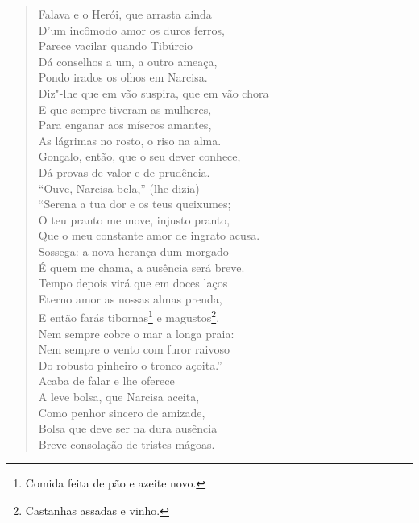 \begin{verse}
Falava e o Herói, que arrasta ainda\\
D'um incômodo amor os duros ferros,\\
Parece vacilar quando Tibúrcio\\
Dá conselhos a um, a outro ameaça,\\
Pondo irados os olhos em Narcisa.\\
Diz"-lhe que em vão suspira, que em vão chora\\
E que sempre tiveram as mulheres,\\
Para enganar aos míseros amantes,\\
As lágrimas no rosto, o riso na alma.\\
Gonçalo, então, que o seu dever conhece,\\
Dá provas de valor e de prudência.\\
``Ouve, Narcisa bela,'' (lhe dizia)\\
``Serena a tua dor e os teus queixumes;\\
O teu pranto me move, injusto pranto,\\
Que o meu constante amor de ingrato acusa.\\
Sossega: a nova herança dum morgado\\ 		\index{\Morg}
É quem me chama, a ausência será breve.\\
Tempo depois virá que em doces laços\\
Eterno amor as nossas almas prenda,\\
E então farás tibornas\footnote{ Comida feita de pão e azeite novo.}
e magustos\footnote{ Castanhas assadas e vinho.}.\\		\index{\Tiborn}
Nem sempre cobre o mar a longa praia:\\
Nem sempre o vento com furor raivoso\\
Do robusto pinheiro o tronco açoita.'' \\[10pt]


Acaba de falar e lhe oferece\\
A leve bolsa, que Narcisa aceita,\\
Como penhor sincero de amizade,\\
Bolsa que deve ser na dura ausência\\
Breve consolação de tristes mágoas. \\[10pt]



\end{verse}
